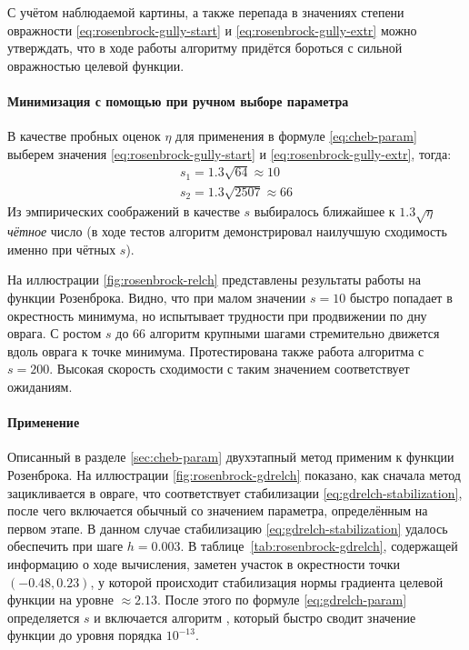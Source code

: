 С учётом наблюдаемой картины, а также перепада в значениях
степени овражности \eqref{eq:rosenbrock-gully-start} и
\eqref{eq:rosenbrock-gully-extr} можно утверждать, что в ходе работы
алгоритму придётся бороться с сильной овражностью целевой функции.

\paragraph{Минимизация с помощью \relch{} при ручном выборе параметра}

В качестве пробных оценок $\eta$ для применения в формуле
\eqref{eq:cheb-param} выберем значения
\eqref{eq:rosenbrock-gully-start} и \eqref{eq:rosenbrock-gully-extr}, тогда:
\begin{gather*}
  s_1 = 1.3 \sqrt{64} \approx 10 \\
  s_2 = 1.3 \sqrt{2507} \approx 66
\end{gather*}
Из эмпирических соображений в качестве $s$ выбиралось ближайшее к
$1.3\sqrt{\eta}$ \emph{чётное} число (в ходе тестов алгоритм
демонстрировал наилучшую сходимость именно при чётных $s$).

На иллюстрации \ref{fig:rosenbrock-relch} представлены результаты
работы \relch{} на функции Розенброка. Видно, что при малом значении
$s=10$ \relch{} быстро попадает в окрестность минимума, но испытывает
трудности при продвижении по дну оврага. С ростом $s$ до 66 алгоритм
крупными шагами стремительно движется вдоль оврага к точке минимума.
Протестирована также работа алгоритма с $s=200$. Высокая скорость
сходимости с таким значением соответствует ожиданиям.

\paragraph{Применение \gdrelch{}}

Описанный в разделе \ref{sec:cheb-param} двухэтапный метод \gdrelch{}
применим к функции Розенброка. На иллюстрации
\ref{fig:rosenbrock-gdrelch} показано, как сначала метод \gd{}
зацикливается в овраге, что соответствует стабилизации
\eqref{eq:gdrelch-stabilization}, после чего включается обычный
\relch{} со значением параметра, определённым на первом этапе. В
данном случае стабилизацию \eqref{eq:gdrelch-stabilization} удалось
обеспечить при шаге $h=0.003$. В таблице \ref{tab:rosenbrock-gdrelch},
содержащей информацию о ходе вычисления, заметен участок в окрестности
точки $(-0.48, 0.23)$, у которой происходит стабилизация нормы
градиента целевой функции на уровне $\approx 2.13$. После этого по формуле
\eqref{eq:gdrelch-param} определяется $s$ и включается алгоритм
\relch{}, который быстро сводит значение функции до уровня порядка
$10^{-13}$.

